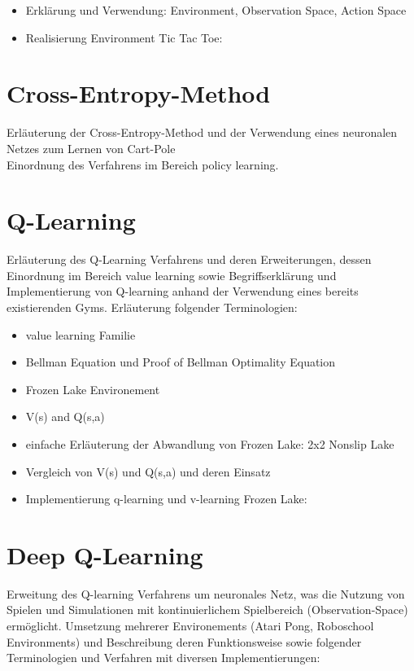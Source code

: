 \documentclass[11pt]{scrartcl}
\begin{document}
\begin{itemize}
\itemsep0pt
\item Erklärung und Verwendung: Environment, Observation Space, Action Space
\item Realisierung Environment Tic Tac Toe:
\end{itemize}

\section{Cross-Entropy-Method}
Erläuterung der Cross-Entropy-Method und der Verwendung eines neuronalen Netzes zum Lernen
von Cart-Pole
\\
Einordnung des Verfahrens im Bereich policy learning.

\section{Q-Learning}
Erläuterung des Q-Learning Verfahrens und deren Erweiterungen, dessen Einordnung im
Bereich value learning sowie Begriffserklärung und Implementierung von Q-learning anhand
der Verwendung eines bereits existierenden Gyms. Erläuterung folgender Terminologien:

\begin{itemize}
\itemsep0pt
\item value learning Familie
\item Bellman Equation und Proof of Bellman Optimality Equation 
\item Frozen Lake Environement
\item V(s) and Q(s,a)
\item einfache Erläuterung der Abwandlung von Frozen Lake: 2x2 Nonslip Lake
\item Vergleich von V(s) und Q(s,a) und deren Einsatz
\item Implementierung q-learning und v-learning Frozen Lake:
\end{itemize}

\section{Deep Q-Learning}
Erweitung des Q-learning Verfahrens um neuronales Netz, was die Nutzung von Spielen und
Simulationen mit kontinuierlichem Spielbereich (Observation-Space) ermöglicht. Umsetzung
mehrerer Environements (Atari Pong, Roboschool Environments) und Beschreibung deren
Funktionsweise sowie folgender Terminologien und Verfahren mit diversen Implementierungen:
\end{document}
